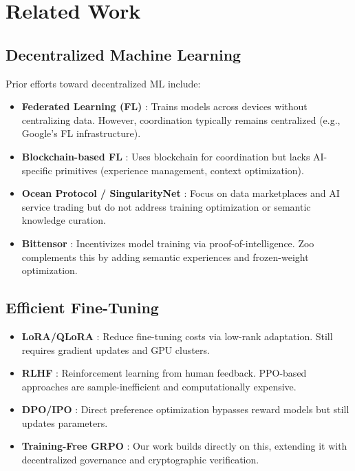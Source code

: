 \documentclass[11pt,a4paper]{article}
\begin{document}
\section{Related Work}

\subsection{Decentralized Machine Learning}

Prior efforts toward decentralized ML include:

\begin{itemize}[leftmargin=*]
\item \textbf{Federated Learning (FL)} \cite{mcmahan2017federated}: Trains models across devices without centralizing data. However, coordination typically remains centralized (e.g., Google's FL infrastructure).
\item \textbf{Blockchain-based FL} \cite{kim2019blockchained}: Uses blockchain for coordination but lacks AI-specific primitives (experience management, context optimization).
\item \textbf{Ocean Protocol / SingularityNet} \cite{ocean2021whitepaper,singularitynet2021whitepaper}: Focus on data marketplaces and AI service trading but do not address training optimization or semantic knowledge curation.
\item \textbf{Bittensor} \cite{bittensor2021whitepaper}: Incentivizes model training via proof-of-intelligence. Zoo complements this by adding semantic experiences and frozen-weight optimization.
\end{itemize}

\subsection{Efficient Fine-Tuning}

\begin{itemize}[leftmargin=*]
\item \textbf{LoRA/QLoRA} \cite{hu2021lora,dettmers2023qlora}: Reduce fine-tuning costs via low-rank adaptation. Still requires gradient updates and GPU clusters.
\item \textbf{RLHF} \cite{ouyang2022training}: Reinforcement learning from human feedback. PPO-based approaches are sample-inefficient and computationally expensive.
\item \textbf{DPO/IPO} \cite{rafailov2023dpo}: Direct preference optimization bypasses reward models but still updates parameters.
\item \textbf{Training-Free GRPO} \cite{tencent2025grpo}: Our work builds directly on this, extending it with decentralized governance and cryptographic verification.
\end{itemize}
\end{document}
